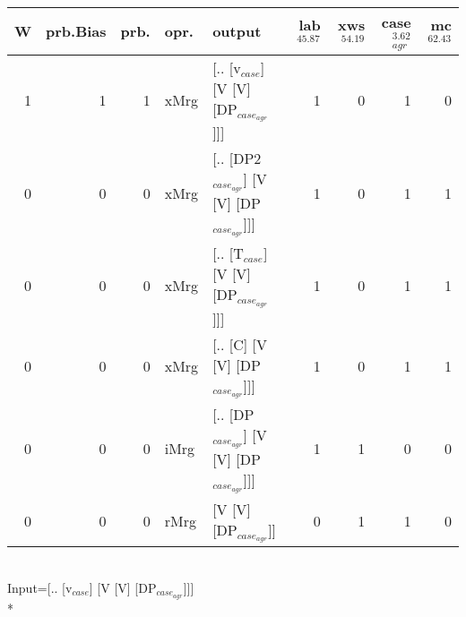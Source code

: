 \begin{tabularx}{\linewidth}{rrrlXrrrr}
\hline
   W &   prb.Bias &   prb. & opr.   & output                                    &   lab$^{45.87}$ &   xws$^{54.19}$ &   case$_{agr}^{3.62}$ &   mc$^{62.43}$ \\
\hline
   1 &       1 &   1 & xMrg & [.. [v$_{case}$] [V [V] [DP$_{case_{agr}}$]]]       &             1 &             0 &                  1 &            0 \\
   0 &       0 &   0 & xMrg & [.. [DP2$_{case_{agr}}$] [V [V] [DP$_{case_{agr}}$]]] &             1 &             0 &                  1 &            1 \\
   0 &       0 &   0 & xMrg & [.. [T$_{case}$] [V [V] [DP$_{case_{agr}}$]]]       &             1 &             0 &                  1 &            1 \\
   0 &       0 &   0 & xMrg & [.. [C] [V [V] [DP$_{case_{agr}}$]]]            &             1 &             0 &                  1 &            1 \\
   0 &       0 &   0 & iMrg & [.. [DP$_{case_{agr}}$] [V [V] [DP$_{case_{agr}}$]]]  &             1 &             1 &                  0 &            0 \\
   0 &       0 &   0 & rMrg & [V [V] [DP$_{case_{agr}}$]]                     &             0 &             1 &                  1 &            0 \\
\hline
\end{tabularx}\endgroup\\
\begingroup\scriptsize Input=[.. [v$_{case}$] [V [V] [DP$_{case_{agr}}$]]]\\*
